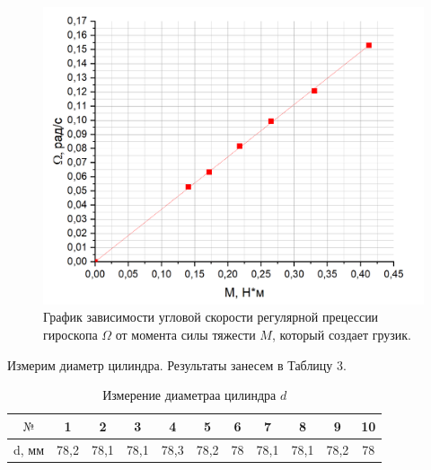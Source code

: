 \documentclass[a4paper,12pt]{article} %
\begin{document}
\begin{figure}[h]
\centering
\includegraphics[scale=0.4]{4}
\caption{График зависимости угловой скорости регулярной прецессии гироскопа $\Omega$ от момента силы тяжести $M$, который создает грузик. }
\end{figure}
\newpage
Измерим диаметр цилиндра. Результаты занесем в Таблицу 3.
\begin{table}[h]
\centering
\begin{tabular}{|c|c|c|c|c|c|c|c|c|c|c|}
\hline
$\text{№}$    & 1    & 2    & 3    & 4    & 5    & 6  & 7    & 8    & 9    & 10 \\ \hline
d, мм & 78,2 & 78,1 & 78,1 & 78,3 & 78,2 & 78 & 78,1 & 78,1 & 78,2 & 78 \\ \hline
\end{tabular}
\caption{Измерение диаметраа цилиндра $d$}
\end{table}
\end{document}
